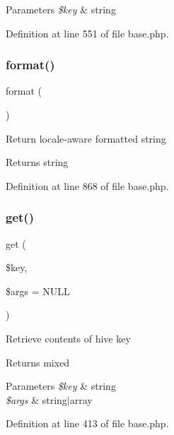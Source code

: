 \begin{DoxyParams}{Parameters}
{\em \$key} & string \\
\hline
\end{DoxyParams}


Definition at line 551 of file base.\+php.

\hypertarget{class_base_afe083716d50b3fb4057e519961b9235c}{}\label{class_base_afe083716d50b3fb4057e519961b9235c} 
\subsubsection{\texorpdfstring{format()}{format()}}
{\footnotesize\ttfamily format (\begin{DoxyParamCaption}{ }\end{DoxyParamCaption})}

Return locale-\/aware formatted string \begin{DoxyReturn}{Returns}
string 
\end{DoxyReturn}


Definition at line 868 of file base.\+php.

\hypertarget{class_base_a17baee8d5275e5926004818839f9d838}{}\label{class_base_a17baee8d5275e5926004818839f9d838} 
\subsubsection{\texorpdfstring{get()}{get()}}
{\footnotesize\ttfamily get (\begin{DoxyParamCaption}\item[{}]{\$key,  }\item[{}]{\$args = {\ttfamily NULL} }\end{DoxyParamCaption})}

Retrieve contents of hive key \begin{DoxyReturn}{Returns}
mixed 
\end{DoxyReturn}

\begin{DoxyParams}{Parameters}
{\em \$key} & string \\
\hline
{\em \$args} & string$\vert$array \\
\hline
\end{DoxyParams}


Definition at line 413 of file base.\+php.

\hypertarget{class_base_a669bbc5855d5fc5ff1959819fd8a987d}{}\label{class_base_a669bbc5855d5fc5ff1959819fd8a987d} 
